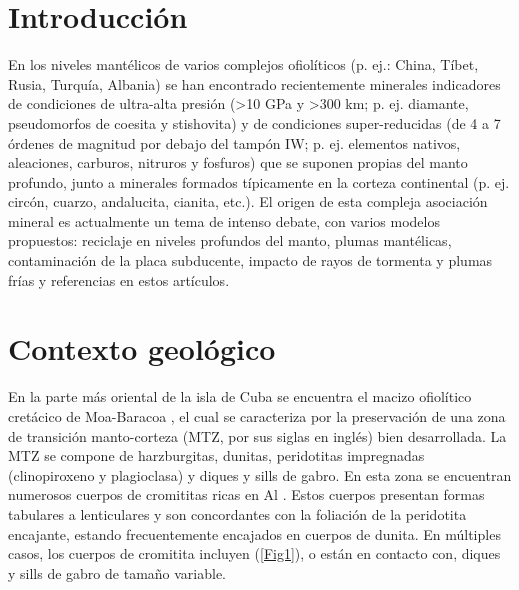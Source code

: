 \documentclass[a4paper,11pt]{article}
\begin{document}
	\begin{multicols}{2}
		\section{Introducción}
		En los niveles mantélicos de varios complejos ofiolíticos (p. ej.: China, Tíbet, Rusia, Turquía, Albania) se han encontrado recientemente minerales indicadores de condiciones de ultra-alta presión (\textgreater10 GPa y \textgreater300 km; p. ej. diamante, pseudomorfos de coesita y stishovita) y de condiciones super-reducidas (de 4 a 7 órdenes de magnitud por debajo del tampón IW; p. ej. elementos nativos, aleaciones, carburos, nitruros y fosfuros) que se suponen propias del manto profundo, junto a minerales formados típicamente en la corteza continental (p. ej. circón, cuarzo, andalucita, cianita, etc.). El origen de esta compleja asociación mineral es actualmente un tema de intenso debate, con varios modelos propuestos: reciclaje en niveles profundos del manto, plumas mantélicas, contaminación de la placa subducente, impacto de rayos de tormenta y plumas frías \cite{Pujol-Sola2018,Xiong} y referencias en estos artículos. 
		\section{Contexto geológico}
		En la parte más oriental de la isla de Cuba se encuentra el macizo ofiolítico cretácico de Moa-Baracoa \cite{Iturralde}, el cual se caracteriza por la preservación de una zona de transición manto-corteza (MTZ, por sus siglas en inglés) bien desarrollada. La MTZ se compone de harzburgitas, dunitas, peridotitas impregnadas (clinopiroxeno y plagioclasa) y diques y sills de gabro. En esta zona se encuentran numerosos cuerpos de cromititas ricas en Al \cite{Proenza1999}. Estos cuerpos presentan formas tabulares a lenticulares y son concordantes con la foliación de la peridotita encajante, estando frecuentemente encajados en cuerpos de dunita. En múltiples casos, los cuerpos de cromitita incluyen (\ref{Fig1}), o están en contacto con, diques y sills de gabro de tamaño variable.
\end{multicols}
	
\end{document}
